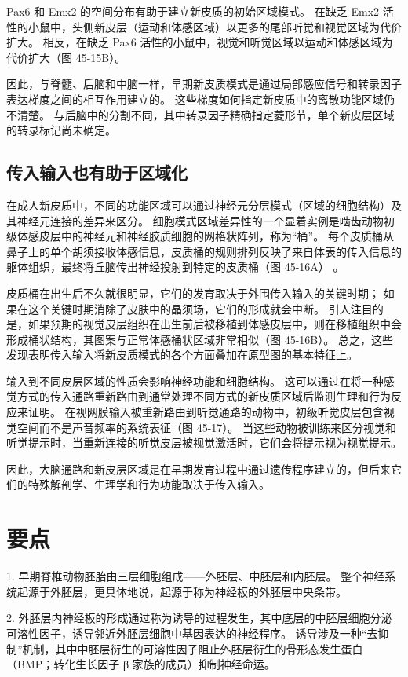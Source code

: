 Pax6 和 Emx2 的空间分布有助于建立新皮质的初始区域模式。 在缺乏 Emx2 活性的小鼠中，头侧新皮层（运动和体感区域）以更多的尾部听觉和视觉区域为代价扩大。 相反，在缺乏 Pax6 活性的小鼠中，视觉和听觉区域以运动和体感区域为代价扩大（图 45-15B）。

因此，与脊髓、后脑和中脑一样，早期新皮质模式是通过局部感应信号和转录因子表达梯度之间的相互作用建立的。 这些梯度如何指定新皮质中的离散功能区域仍不清楚。 与后脑中的分割不同，其中转录因子精确指定菱形节，单个新皮层区域的转录标记尚未确定。

\subsection{传入输入也有助于区域化}
在成人新皮质中，不同的功能区域可以通过神经元分层模式（区域的细胞结构）及其神经元连接的差异来区分。 细胞模式区域差异性的一个显着实例是啮齿动物初级体感皮层中的神经元和神经胶质细胞的网格状阵列，称为“桶”。 每个皮质桶从鼻子上的单个胡须接收体感信息，皮质桶的规则排列反映了来自体表的传入信息的躯体组织，最终将丘脑传出神经投射到特定的皮质桶（图 45-16A） 。

皮质桶在出生后不久就很明显，它们的发育取决于外围传入输入的关键时期； 如果在这个关键时期消除了皮肤中的晶须场，它们的形成就会中断。 引人注目的是，如果预期的视觉皮层组织在出生前后被移植到体感皮层中，则在移植组织中会形成桶状结构，其图案与正常体感桶状区域非常相似（图 45-16B）。 总之，这些发现表明传入输入将新皮质模式的各个方面叠加在原型图的基本特征上。

输入到不同皮层区域的性质会影响神经功能和细胞结构。 这可以通过在将一种感觉方式的传入通路重新路由到通常处理不同方式的新皮质区域后监测生理和行为反应来证明。 在视网膜输入被重新路由到听觉通路的动物中，初级听觉皮层包含视觉空间而不是声音频率的系统表征（图 45-17）。 当这些动物被训练来区分视觉和听觉提示时，当重新连接的听觉皮层被视觉激活时，它们会将提示视为视觉提示。

因此，大脑通路和新皮层区域是在早期发育过程中通过遗传程序建立的，但后来它们的特殊解剖学、生理学和行为功能取决于传入输入。


\section{要点}
1. 早期脊椎动物胚胎由三层细胞组成——外胚层、中胚层和内胚层。 整个神经系统起源于外胚层，更具体地说，起源于称为神经板的外胚层中央条带。 

2. 外胚层内神经板的形成通过称为诱导的过程发生，其中底层的中胚层细胞分泌可溶性因子，诱导邻近外胚层细胞中基因表达的神经程序。 诱导涉及一种“去抑制”机制，其中中胚层衍生的可溶性因子阻止外胚层衍生的骨形态发生蛋白（BMP；转化生长因子 β 家族的成员）抑制神经命运。 

